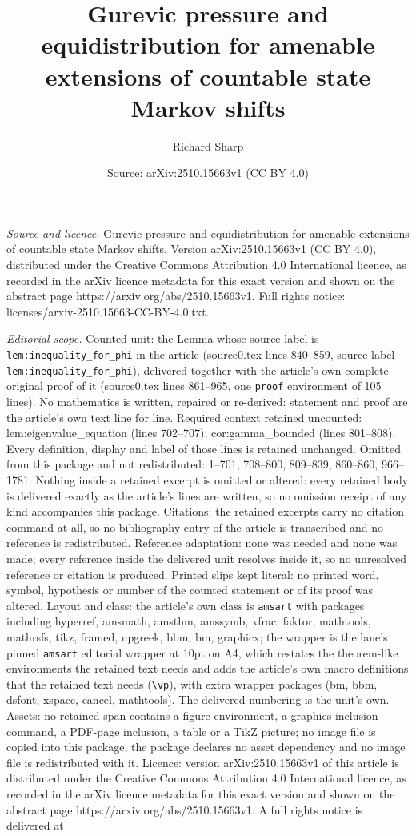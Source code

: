 \documentclass[10pt,a4paper]{amsart}
\title[Gurevic pressure and equidistribution for amenable extension]{Gurevic pressure and equidistribution for amenable extensions of countable state Markov shifts}
\author{Richard Sharp}
\date{Source: arXiv:2510.15663v1 (CC BY 4.0)}
\begin{document}
\maketitle

\noindent\emph{Source and licence.} Gurevic pressure and equidistribution for amenable extensions of countable state Markov shifts. Version arXiv:2510.15663v1 (CC BY 4.0), distributed under the Creative Commons Attribution 4.0 International licence, as recorded in the arXiv licence metadata for this exact version and shown on the abstract page https://arxiv.org/abs/2510.15663v1. Full rights notice: licenses/arxiv-2510.15663-CC-BY-4.0.txt.\par\smallskip

\noindent\textit{Editorial scope.} Counted unit: the Lemma whose source label is \texttt{lem:inequality\_for\_phi} in the article (source0.tex lines 840--859, source label \texttt{lem:inequality\_for\_phi}), delivered together with the article's own complete original proof of it (source0.tex lines 861--965, one \texttt{proof} environment of 105 lines). No mathematics is written, repaired or re-derived: statement and proof are the article's own text line for line. Required context retained uncounted: lem:eigenvalue\_equation (lines 702--707); cor:gamma\_bounded (lines 801--808). Every definition, display and label of those lines is retained unchanged. Omitted from this package and not redistributed: 1--701, 708--800, 809--839, 860--860, 966--1781. Nothing inside a retained excerpt is omitted or altered: every retained body is delivered exactly as the article's lines are written, so no omission receipt of any kind accompanies this package. Citations: the retained excerpts carry no citation command at all, so no bibliography entry of the article is transcribed and no reference is redistributed. Reference adaptation: none was needed and none was made; every reference inside the delivered unit resolves inside it, so no unresolved reference or citation is produced. Printed slips kept literal: no printed word, symbol, hypothesis or number of the counted statement or of its proof was altered. Layout and class: the article's own class is \texttt{amsart} with packages including hyperref, amsmath, amsthm, amssymb, xfrac, faktor, mathtools, mathrsfs, tikz, framed, upgreek, bbm, bm, graphicx; the wrapper is the lane's pinned \texttt{amsart} editorial wrapper at 10pt on A4, which restates the theorem-like environments the retained text needs and adds the article's own macro definitions that the retained text needs (\texttt{\textbackslash vp}), with extra wrapper packages (bm, bbm, dsfont, xspace, cancel, mathtools). The delivered numbering is the unit's own. Assets: no retained span contains a figure environment, a graphics-inclusion command, a PDF-page inclusion, a table or a TikZ picture; no image file is copied into this package, the package declares no asset dependency and no image file is redistributed with it. Licence: version arXiv:2510.15663v1 of this article is distributed under the Creative Commons Attribution 4.0 International licence, as recorded in the arXiv licence metadata for this exact version and shown on the abstract page https://arxiv.org/abs/2510.15663v1. A full rights notice is delivered at 
\end{document}
